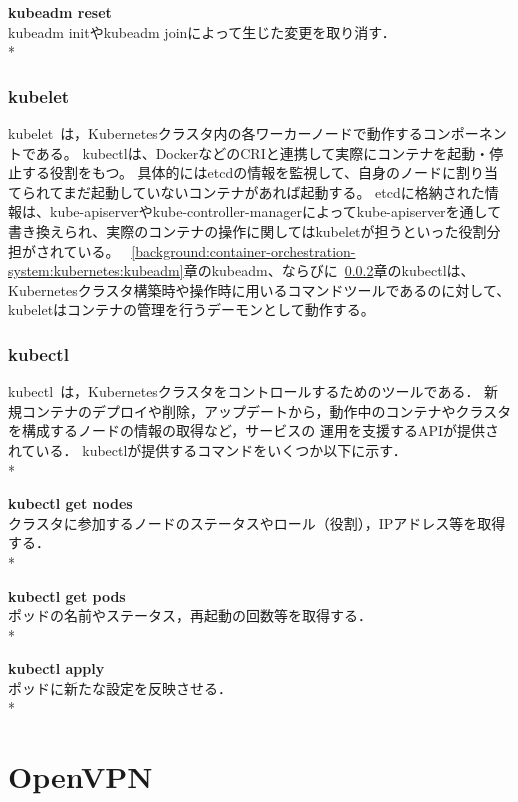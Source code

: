 {\bf kubeadm reset}\\
kubeadm initやkubeadm joinによって生じた変更を取り消す．\\*

\subsubsection{kubelet}
\label{background:container-orchestration-system:kubernetes:kubelet}

kubelet~\cite{kubelet}は，Kubernetesクラスタ内の各ワーカーノードで動作するコンポーネントである。
kubectlは、DockerなどのCRIと連携して実際にコンテナを起動・停止する役割をもつ。
具体的にはetcdの情報を監視して、自身のノードに割り当てられてまだ起動していないコンテナがあれば起動する。
etcdに格納された情報は、kube-apiserverやkube-controller-managerによってkube-apiserverを通して書き換えられ、実際のコンテナの操作に関してはkubeletが担うといった役割分担がされている。
~\ref{background:container-orchestration-system:kubernetes:kubeadm}章のkubeadm、ならびに~\ref{background:container-orchestration-system:kubernetes:kubectl}章のkubectlは、Kubernetesクラスタ構築時や操作時に用いるコマンドツールであるのに対して、
kubeletはコンテナの管理を行うデーモンとして動作する。

\subsubsection{kubectl}
\label{background:container-orchestration-system:kubernetes:kubectl}

kubectl~\cite{kubectl}は，Kubernetesクラスタをコントロールするためのツールである．
新規コンテナのデプロイや削除，アップデートから，動作中のコンテナやクラスタを構成するノードの情報の取得など，サービスの
運用を支援するAPIが提供されている．
kubectlが提供するコマンドをいくつか以下に示す．\\*

{\bf kubectl get nodes}\\
クラスタに参加するノードのステータスやロール（役割），IPアドレス等を取得する．\\*

{\bf kubectl get pods}\\
ポッドの名前やステータス，再起動の回数等を取得する．\\*

{\bf kubectl apply}\\
ポッドに新たな設定を反映させる．\\*

\section{OpenVPN}
\label{background:openvpn}

